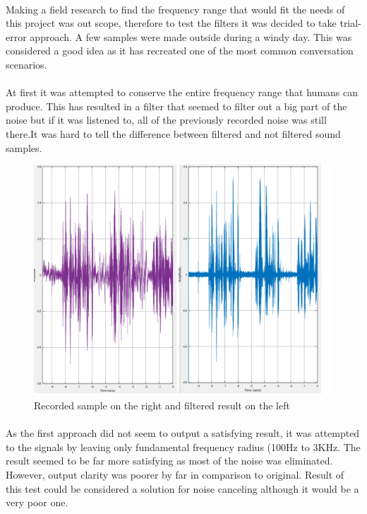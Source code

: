 \paragraph{} Making a field research to find the frequency range that would fit the needs of this project was out scope, therefore to test the filters it was decided to take trial-error approach. A few samples were made outside during a windy day. This was considered a good idea as it has recreated one of the most common conversation scenarios.
\paragraph{} At first it was attempted to conserve the entire frequency range that humans can produce. This has resulted in a filter that seemed to filter out a big part of the noise but if it was listened to, all of the previously recorded noise was still there.It was hard to tell the difference between filtered and not filtered sound samples.

\begin{figure}[htp]
  \centering
    \includegraphics[width=0.7\paperwidth]{Illustrations/100HZto17KHzfilter}
    \caption{Recorded sample on the right and filtered result on the left}
\end{figure}

\paragraph{} As the first approach did not seem to output a satisfying result, it was attempted to the signals by leaving only fundamental frequency radius (100Hz to 3KHz. The result seemed to be far more satisfying as most of the noise was eliminated. However, output clarity was poorer by far in comparison to original. Result of this test could be considered a solution for noise canceling although it would be a very poor one.

